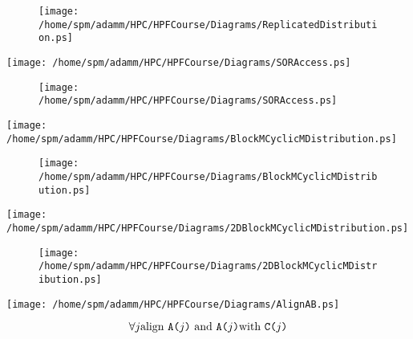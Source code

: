 \documentclass{article}
\begin{document}
{\newpage
\clearpage
\samepage \begin{figure}[H]
\texttt{[image: /home/spm/adamm/HPC/HPFCourse/Diagrams/ReplicatedDistribution.ps]}
 
\label{STARDistributionVisualisation:fig}
\end{figure}
}

{\newpage
\clearpage
\samepage \texttt{[image: /home/spm/adamm/HPC/HPFCourse/Diagrams/SORAccess.ps]}
}

{\newpage
\clearpage
\samepage \begin{figure}[H]
\hspace*{4.5cm}\texttt{[image: /home/spm/adamm/HPC/HPFCourse/Diagrams/SORAccess.ps]}

\label{SORAccessPatterns:fig}
\end{figure}
}

{\newpage
\clearpage
\samepage \texttt{[image: /home/spm/adamm/HPC/HPFCourse/Diagrams/BlockMCyclicMDistribution.ps]}
}

{\newpage
\clearpage
\samepage \begin{figure}[H]
\hspace*{0.0cm}\texttt{[image: /home/spm/adamm/HPC/HPFCourse/Diagrams/BlockMCyclicMDistribution.ps]}

\label{BLOCKmCYCLICmDistribution:fig}
\end{figure}
}

{\newpage
\clearpage
\samepage \texttt{[image: /home/spm/adamm/HPC/HPFCourse/Diagrams/2DBlockMCyclicMDistribution.ps]}
}

{\newpage
\clearpage
\samepage \begin{figure}[H]
\hspace*{3.0cm}\texttt{[image: /home/spm/adamm/HPC/HPFCourse/Diagrams/2DBlockMCyclicMDistribution.ps]}

\label{2DBlockMCyclicMDistribution}
\end{figure}
}

{\newpage
\clearpage
\samepage \texttt{[image: /home/spm/adamm/HPC/HPFCourse/Diagrams/AlignAB.ps]}
}

{\newpage
\clearpage
\samepage \begin{displaymath}\forall j \mbox{align {\tt A(}}j\mbox{{\tt )} and {\tt A(}}j\mbox{{\tt
)}with {\tt C(}}j\mbox{{\tt )}}
\end{displaymath}
}
\end{document}
